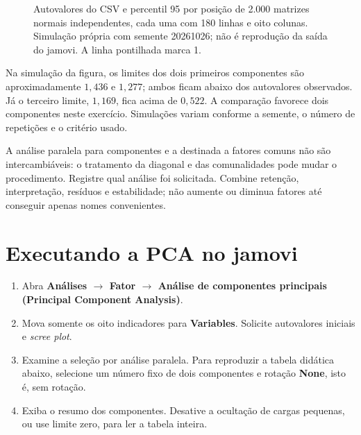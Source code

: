 \begin{figure}[H]
\centering
{}
\caption{Autovalores do CSV e percentil 95 por posição de 2.000 matrizes normais independentes, cada uma com 180 linhas e oito colunas. Simulação própria com semente 20261026; não é reprodução da saída do jamovi. A linha pontilhada marca 1.}
\label{fig:paralela-dimensoes}
\end{figure}

Na simulação da figura, os limites dos dois primeiros componentes são aproximadamente $1{,}436$ e $1{,}277$; ambos ficam abaixo dos autovalores observados. Já o terceiro limite, $1{,}169$, fica acima de $0{,}522$. A comparação favorece dois componentes neste exercício. Simulações variam conforme a semente, o número de repetições e o critério usado.

A análise paralela para componentes e a destinada a fatores comuns não são intercambiáveis: o tratamento da diagonal e das comunalidades pode mudar o procedimento. Registre qual análise foi solicitada. Combine retenção, interpretação, resíduos e estabilidade; não aumente ou diminua fatores até conseguir apenas nomes convenientes.

\section{Executando a PCA no jamovi}

\begin{enumerate}
  \item Abra \textbf{Análises $\rightarrow$ Fator $\rightarrow$ Análise de componentes principais (Principal Component Analysis)}.
  \item Mova somente os oito indicadores para \textbf{Variables}. Solicite autovalores iniciais e \textit{scree plot}.
  \item Examine a seleção por análise paralela. Para reproduzir a tabela didática abaixo, selecione um número fixo de dois componentes e rotação \textbf{None}, isto é, sem rotação.
  \item Exiba o resumo dos componentes. Desative a ocultação de cargas pequenas, ou use limite zero, para ler a tabela inteira.
\end{enumerate}

